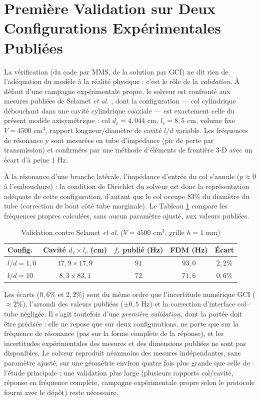 \documentclass[11pt,a4paper,twocolumn]{article}
\begin{document}
\section{Première Validation sur Deux Configurations Expérimentales Publiées}
\label{sec:validation}
La vérification (du code par MMS, de la solution par GCI) ne dit rien de l'adéquation du modèle à la réalité physique : c'est le rôle de la \emph{validation}. À défaut d'une campagne expérimentale propre, le solveur est confronté aux mesures publiées de Selamet \emph{et al.} \cite{selamet1997circular}, dont la configuration — col cylindrique débouchant dans une cavité cylindrique coaxiale — est exactement celle du présent modèle axisymétrique : col $d_c = 4{,}044$ cm, $l_c = 8{,}5$ cm, volume fixe $V = 4500\text{ cm}^3$, rapport longueur/diamètre de cavité $l/d$ variable. Les fréquences de résonance y sont mesurées en tube d'impédance (pic de perte par transmission) et confirmées par une méthode d'éléments de frontière 3-D avec un écart d'à peine 1 Hz.

À la résonance d'une branche latérale, l'impédance d'entrée du col s'annule ($p\approx0$ à l'embouchure) : la condition de Dirichlet du solveur est donc la représentation adéquate de cette configuration, d'autant que le col occupe $83\%$ du diamètre du tube (correction de bout côté tube marginale). Le Tableau \ref{tab:selamet} compare les fréquences propres calculées, sans aucun paramètre ajusté, aux valeurs publiées.

\begin{table}[h]
\centering
\caption{Validation contre Selamet \emph{et al.} \cite{selamet1997circular} ($V=4500$ cm$^3$, grille $h=1$ mm)}
\label{tab:selamet}
\begin{tabular}{lcccc}
\toprule
Config. & Cavité $d_v \times l_v$ (cm) & $f_r$ publié (Hz) & FDM (Hz) & Écart \\
\midrule
$l/d=1{,}0$ & $17{,}9 \times 17{,}9$ & $91$ & $93{,}0$ & $2{,}2\%$ \\
$l/d=10$ & $8{,}3 \times 83{,}1$ & $72$ & $71{,}6$ & $0{,}6\%$ \\
\bottomrule
\end{tabular}
\end{table}

Les écarts ($0{,}6\%$ et $2{,}2\%$) sont du même ordre que l'incertitude numérique GCI ($\approx2\%$), l'arrondi des valeurs publiées ($\pm0{,}5$ Hz) et la correction d'interface col–tube négligée. Il s'agit toutefois d'une \emph{première validation}, dont la portée doit être précisée : elle ne repose que sur deux configurations, ne porte que sur la fréquence de résonance (pas sur la forme complète de la réponse), et les incertitudes expérimentales des mesures et des dimensions publiées ne sont pas disponibles. Le solveur reproduit néanmoins des mesures indépendantes, sans paramètre ajusté, sur une géométrie environ quatre fois plus grande que celle de l'étude principale ; une validation plus large (plusieurs rapports col/cavité, réponse en fréquence complète, campagne expérimentale propre selon le protocole fourni avec le dépôt) reste nécessaire.
\end{document}

